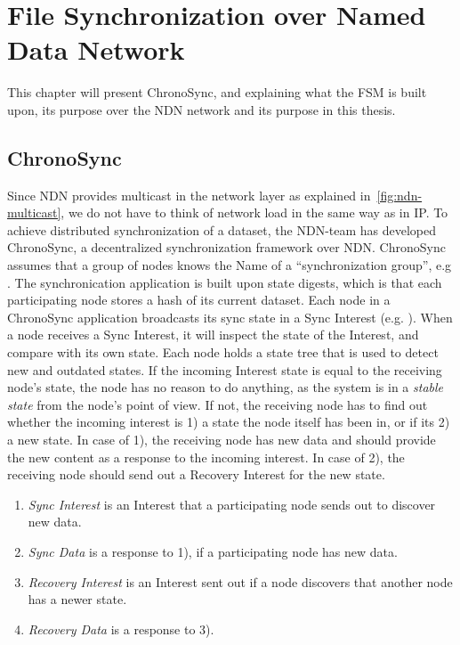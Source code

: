 \chapter{File Synchronization over Named Data Network}\label{chp3:application}
This chapter will present ChronoSync, and explaining what the \gls{FSM} is built upon, its purpose over the \gls{NDN} network and its purpose in this thesis. 

\section{ChronoSync}\label{chronosync}
Since \gls{NDN} provides multicast in the network layer as explained in~\autoref{fig:ndn-multicast}, we do not have to think of network load in the same way as in \gls{IP}.  
To achieve distributed synchronization of a dataset, the \gls{NDN}-team has developed ChronoSync, a decentralized synchronization framework over \gls{NDN}. 
ChronoSync assumes that a group of nodes knows the Name of a ``synchronization group'', e.g .
The synchronication application is built upon state digests, which is that each participating node stores a hash of its current dataset. 
Each node in a ChronoSync application broadcasts its sync state in a Sync Interest (e.g. ).
When a node receives a Sync Interest, it will inspect the state of the Interest, and compare with its own state.
Each node holds a state tree that is used to detect new and outdated states.
If the incoming Interest state is equal to the receiving node's state, the node has no reason to do anything, as the system is in a \textit{stable state} from the node's point of view.
If not, the receiving node has to find out whether the incoming interest is 1) a state the node itself has been in, or if its 2) a new state.
In case of 1), the receiving node has new data and should provide the new content as a response to the incoming interest. In case of 2), the receiving node should send out a Recovery Interest for the new state.

\begin{enumerate}
  \item \textit{Sync Interest} is an Interest that a participating node sends out to discover new data.
  \item \textit{Sync Data} is a response to 1), if a participating node has new data.
  \item \textit{Recovery Interest} is an Interest sent out if a node discovers that another node has a newer state.
  \item \textit{Recovery Data} is a response to 3).
\end{enumerate}

